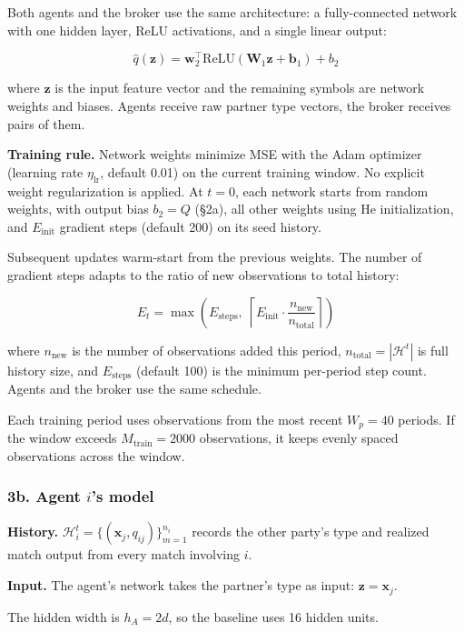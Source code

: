\documentclass[11pt]{article}
\begin{document}
Both agents and the broker use the same architecture: a fully-connected network with one hidden layer, ReLU activations, and a single linear output:

\[\hat{q}(\mathbf{z}) = \mathbf{w}_2^\top \text{ReLU}(\mathbf{W}_1 \mathbf{z} + \mathbf{b}_1) + b_2\]

where \(\mathbf{z}\) is the input feature vector and the remaining symbols are network weights and biases. Agents receive raw partner type vectors, the broker receives pairs of them.

\textbf{Training rule.} Network weights minimize MSE with the Adam optimizer (learning rate \(\eta_{\mathrm{lr}}\), default 0.01) on the current training window. No explicit weight regularization is applied. At \(t = 0\), each network starts from random weights, with output bias \(b_2=Q\) (§2a), all other weights using He initialization, and \(E_{\text{init}}\) gradient steps (default 200) on its seed history.

Subsequent updates warm-start from the previous weights. The number of gradient steps adapts to the ratio of new observations to total history:

\[E_t = \max\!\left(E_{\text{steps}}, \; \left\lceil E_{\text{init}} \cdot \frac{n_{\text{new}}}{n_{\text{total}}} \right\rceil\right)\]

where \(n_{\text{new}}\) is the number of observations added this period, \(n_{\text{total}} = |\mathcal{H}^t|\) is full history size, and \(E_{\text{steps}}\) (default 100) is the minimum per-period step count. Agents and the broker use the same schedule.

Each training period uses observations from the most recent \(W_p = 40\) periods. If the window exceeds \(M_{\text{train}} = 2000\) observations, it keeps evenly spaced observations across the window.

\subsubsection{\texorpdfstring{3b. Agent \(i\)'s model}{3b. Agent i's model}}\label{b.-agent-is-model}

\textbf{History.} \(\mathcal{H}_i^t = \{(\mathbf{x}_j, q_{ij})\}_{m=1}^{n_i}\) records the other party's type and realized match output from every match involving \(i\).

\textbf{Input.} The agent's network takes the partner's type as input: \(\mathbf{z} = \mathbf{x}_j\).

The hidden width is \(h_A = 2d\), so the baseline uses 16 hidden units.
\end{document}
